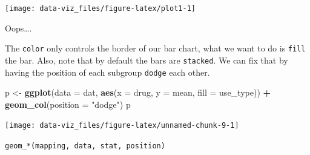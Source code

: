 \documentclass[]{book}
\newenvironment{Shaded}{\begin{snugshade}}{\end{snugshade}}
\newcommand{\KeywordTok}[1]{\textcolor[rgb]{0.13,0.29,0.53}{\textbf{#1}}}
\newcommand{\DataTypeTok}[1]{\textcolor[rgb]{0.13,0.29,0.53}{#1}}
\newcommand{\StringTok}[1]{\textcolor[rgb]{0.31,0.60,0.02}{#1}}
\newcommand{\OperatorTok}[1]{\textcolor[rgb]{0.81,0.36,0.00}{\textbf{#1}}}
\newcommand{\NormalTok}[1]{#1}
\theoremstyle{definition}
\theoremstyle{definition}
\theoremstyle{definition}
\theoremstyle{remark}
\begin{document}
\begin{center}\texttt{[image: data-viz\_files/figure-latex/plot1-1]} \end{center}

Oops\ldots{}.

The \texttt{color} only controls the border of our bar chart, what we
want to do is \texttt{fill} the bar. Also, note that by default the bars
are \texttt{stacked}. We can fix that by having the position of each
subgroup \texttt{dodge} each other.

\begin{Shaded}
\begin{Highlighting}[]
\NormalTok{p <-}\StringTok{ }\KeywordTok{ggplot}\NormalTok{(}\DataTypeTok{data =}\NormalTok{ dat, }\KeywordTok{aes}\NormalTok{(}\DataTypeTok{x =}\NormalTok{ drug, }\DataTypeTok{y =}\NormalTok{ mean, }\DataTypeTok{fill =}\NormalTok{ use_type)) }\OperatorTok{+}
\StringTok{  }\KeywordTok{geom_col}\NormalTok{(}\DataTypeTok{position =} \StringTok{"dodge"}\NormalTok{)}
\NormalTok{p}
\end{Highlighting}
\end{Shaded}

\begin{center}\texttt{[image: data-viz\_files/figure-latex/unnamed-chunk-9-1]} \end{center}

\texttt{geom\_*(mapping,\ data,\ stat,\ position)}
\end{document}
